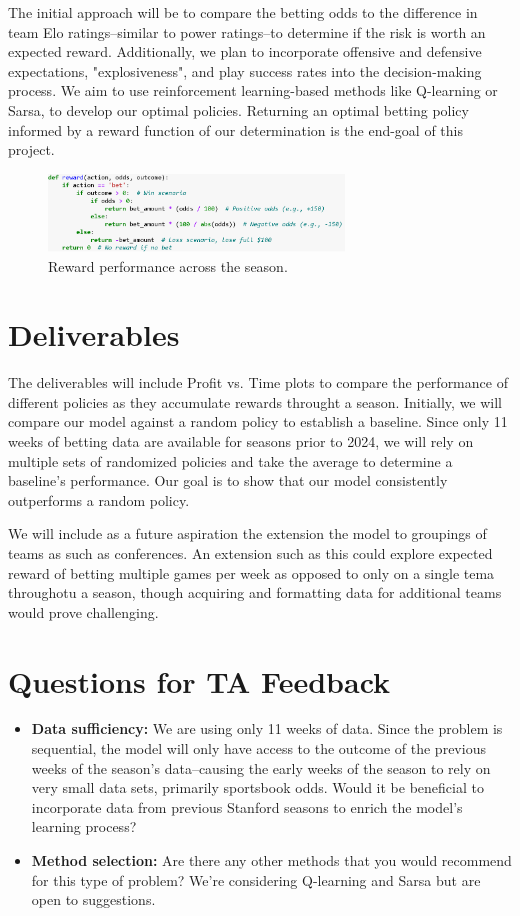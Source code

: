 \documentclass{article}
\begin{document}
The initial approach will be to compare the betting odds to the difference in team Elo ratings--similar to power ratings--to determine if the risk is worth an expected reward. 
Additionally, we plan to incorporate offensive and defensive expectations, "explosiveness", and play success rates into the decision-making process. We aim to use reinforcement 
learning-based methods like Q-learning or Sarsa, to develop our optimal policies. Returning an optimal betting policy informed by a reward function of our determination is the end-goal of this project.

\begin{figure}[h!]
    \centering
    \includegraphics[width=0.7\textwidth]{reward.png}
    \caption{Reward performance across the season.}
\end{figure}

\section*{Deliverables}

The deliverables will include Profit vs. Time plots to compare the performance of different policies as they accumulate rewards throught a season. 
Initially, we will compare our model against a random policy to establish a baseline. Since only 11 weeks of betting data are available for seasons prior to 2024, we will rely on multiple sets of randomized  
policies and take the average to determine a baseline’s performance. Our goal is to show that our model consistently outperforms a random policy.


We will include as a future aspiration the extension the model to groupings of teams as such as conferences.  An extension such as this could explore expected reward of betting multiple games per week as opposed
to only on a single tema throughotu a season, though acquiring and formatting data for additional teams would prove challenging.

\section*{Questions for TA Feedback}
\begin{itemize}
    \item \textbf{Data sufficiency:} We are using only 11 weeks of data. Since the problem is sequential, the model will only have access to the outcome of the previous weeks of the season's data--causing the early 
    weeks of the season to rely on very small data sets, primarily sportsbook odds. Would it be beneficial to incorporate data from previous Stanford seasons to enrich the model’s learning process?
    \item \textbf{Method selection:} Are there any other methods that you would recommend for this type of problem? We’re considering Q-learning and Sarsa but are open to suggestions.
\end{itemize}
\end{document}
